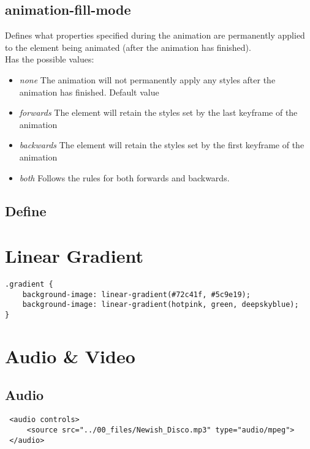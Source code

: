 \documentclass[]{article}
\newcommand{\<}{\guilsinglleft}
\renewcommand{\>}{\guilsinglright}
\renewcommand{\it}[1]{\textit{#1}}
\begin{document}
\subsection{animation-fill-mode}
Defines what properties specified during the animation are permanently applied to the element being animated (after the animation has finished).\\
Has the possible values:
\begin{itemize}
	\item \it{none}
	\subitem The animation will not permanently apply any styles after the animation has finished.
	\subitem Default value
	
	\item \it{forwards}
	\subitem The element will retain the styles set by the last keyframe of the animation
	
	\item \it{backwards}
	\subitem The element will retain the styles set by the first keyframe of the animation
	
	\item \it{both}
	\subitem Follows the rules for both forwards and backwards.
\end{itemize}

\subsection{Define}

\section{Linear Gradient}
\begin{lstlisting}
.gradient {
	background-image: linear-gradient(#72c41f, #5c9e19);
	background-image: linear-gradient(hotpink, green, deepskyblue);
}
\end{lstlisting}

\section{Audio \& Video}
\subsection{Audio}
\begin{lstlisting}
 <audio controls>
	 <source src="../00_files/Newish_Disco.mp3" type="audio/mpeg">
 </audio>
\end{lstlisting}
\end{document}
